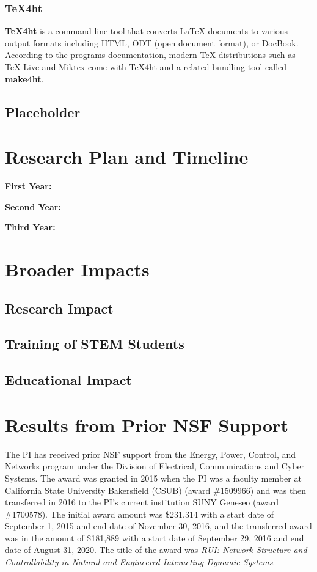 \documentclass[11pt]{article}
\begin{document}
\subsubsection{TeX4ht}
\textbf{TeX4ht} is a command line tool that converts LaTeX documents to various output formats including HTML, ODT (open document format), or DocBook.  According to the programs documentation, modern TeX distributions such as TeX Live and Miktex come with TeX4ht and a related bundling tool called \textbf{make4ht}.  



\subsection{Placeholder}


\section{Research Plan and Timeline}


\noindent\textbf{First Year:}  

\noindent\textbf{Second Year:}  

\noindent\textbf{Third Year:}  
\section{Broader Impacts}

\subsection{Research Impact}


\subsection{Training of STEM Students}

\subsection{Educational Impact}    

\section{Results from Prior NSF Support}
The PI has received prior NSF support from the Energy, Power, Control, and Networks program under the Division of Electrical, Communications and Cyber Systems.  The award was granted in 2015 when the PI was a faculty member at California State University Bakersfield (CSUB) (award \#1509966) and was then transferred in 2016 to the PI's current institution SUNY Geneseo (award \#1700578).  The initial award amount was \$231,314 with a start date of September 1, 2015 and end date of November 30, 2016, and the transferred award was in the amount of \$181,889 with a start date of September 29, 2016 and end date of August 31, 2020.  The title of the award was \textit{RUI: Network Structure and Controllability in Natural and Engineered Interacting Dynamic Systems}.
\end{document}
